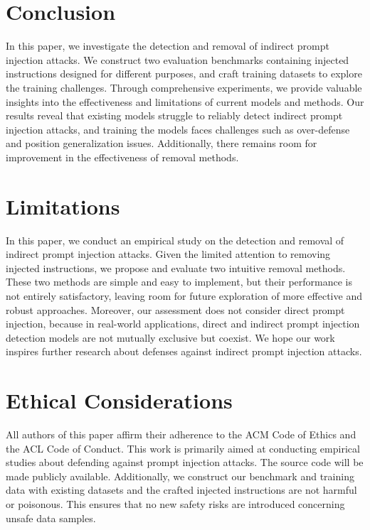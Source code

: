 \section{Conclusion}
In this paper, we investigate the detection and removal of indirect prompt injection attacks. We construct two evaluation benchmarks containing injected instructions designed for different purposes, and craft training datasets to explore the training challenges. Through comprehensive experiments, we provide valuable insights into the effectiveness and limitations of current models and methods.
Our results reveal that existing models struggle to reliably detect indirect prompt injection attacks, and training the models faces challenges such as over-defense and position generalization issues. Additionally, there remains room for improvement in the effectiveness of removal methods.

\section*{Limitations}
In this paper, we conduct an empirical study on the detection and removal of indirect prompt injection attacks. Given the limited attention to removing injected instructions, we propose and evaluate two intuitive removal methods. These two methods are simple and easy to implement, but their performance is not entirely satisfactory, leaving room for future exploration of more effective and robust approaches. Moreover, our assessment does not consider direct prompt injection, because in real-world applications, direct and indirect prompt injection detection models are not mutually exclusive but coexist.
We hope our work inspires further research about defenses against indirect prompt injection attacks. 

\section*{Ethical Considerations}
All authors of this paper affirm their adherence to the ACM Code of Ethics and the ACL Code of Conduct. This work is primarily aimed at conducting empirical studies about defending against prompt injection attacks. The source code will be made publicly available. Additionally, we construct our benchmark and training data with existing datasets and the crafted injected instructions are not harmful or poisonous. This ensures that no new safety risks are introduced concerning unsafe data samples.
